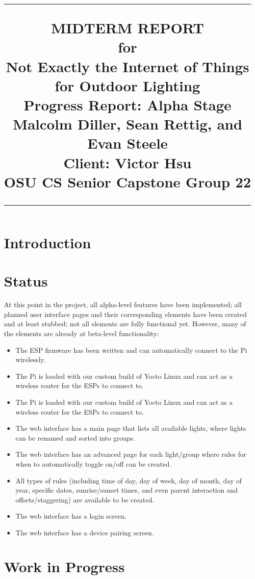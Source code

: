 \documentclass[oneside,openright]{book}
\title{
	\flushright
		\rule{16cm}{5pt}\vskip1cm
		\Huge{MIDTERM REPORT}\\
	for\\
		\vspace{2cm}
	Not Exactly the Internet of Things for Outdoor Lighting\\
		\vspace{2cm}
	\LARGE{Progress Report:}
	\vspace{2cm}
	\LARGE{Alpha Stage\\}
	\vspace{2cm}
	Malcolm Diller, Sean Rettig, and Evan Steele\\
        Client: Victor Hsu\\
        OSU CS Senior Capstone Group 22
		\vfill
		\rule{16cm}{5pt}
}
\date{}
\begin{document}
\maketitle
\tableofcontents
\newpage
{}
\section{Introduction}

\section{Status}

At this point in the project, all alpha-level features have been implemented;
all planned user interface pages and their corresponding elements have been
created and at least stubbed; not all elements are fully functional yet.
However, many of the elements are already at beta-level functionality:

\begin{itemize}
    \item The ESP firmware has been written and can automatically connect to
        the Pi wirelessly.
    \item The Pi is loaded with our custom build of Yocto Linux and can act as
        a wireless router for the ESPs to connect to.
    \item The Pi is loaded with our custom build of Yocto Linux and can act as
        a wireless router for the ESPs to connect to.
    \item The web interface has a main page that lists all available lights,
        where lights can be renamed and sorted into groups.
    \item The web interface has an advanced page for each light/group where
        rules for when to automatically toggle on/off can be created.
    \item All types of rules (including time of day, day of week, day of month,
        day of year, specific dates, sunrise/sunset times, and even parent
        interaction and offsets/staggering) are available to be created.
    \item The web interface has a login screen.
    \item The web interface has a device pairing screen.
\end{itemize}

\section{Work in Progress}
\end{document}
